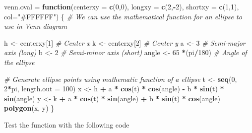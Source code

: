 \documentclass[
]{article}
\newenvironment{Shaded}{\begin{snugshade}}{\end{snugshade}}
\newcommand{\AttributeTok}[1]{\textcolor[rgb]{0.13,0.29,0.53}{#1}}
\newcommand{\CommentTok}[1]{\textcolor[rgb]{0.56,0.35,0.01}{\textit{#1}}}
\newcommand{\ControlFlowTok}[1]{\textcolor[rgb]{0.13,0.29,0.53}{\textbf{#1}}}
\newcommand{\DecValTok}[1]{\textcolor[rgb]{0.00,0.00,0.81}{#1}}
\newcommand{\FunctionTok}[1]{\textcolor[rgb]{0.13,0.29,0.53}{\textbf{#1}}}
\newcommand{\NormalTok}[1]{#1}
\newcommand{\OtherTok}[1]{\textcolor[rgb]{0.56,0.35,0.01}{#1}}
\newcommand{\SpecialCharTok}[1]{\textcolor[rgb]{0.81,0.36,0.00}{\textbf{#1}}}
\newcommand{\StringTok}[1]{\textcolor[rgb]{0.31,0.60,0.02}{#1}}
\begin{document}
\begin{Shaded}
\begin{Highlighting}[]
\NormalTok{venn.oval }\OtherTok{=} \ControlFlowTok{function}\NormalTok{(}\AttributeTok{centerxy =} \FunctionTok{c}\NormalTok{(}\DecValTok{0}\NormalTok{,}\DecValTok{0}\NormalTok{), }\AttributeTok{longxy =} \FunctionTok{c}\NormalTok{(}\DecValTok{2}\NormalTok{,}\SpecialCharTok{{-}}\DecValTok{2}\NormalTok{), }
                 \AttributeTok{shortxy =} \FunctionTok{c}\NormalTok{(}\DecValTok{1}\NormalTok{,}\DecValTok{1}\NormalTok{), }\AttributeTok{col=}\StringTok{"\#FFFFFF"}\NormalTok{)}
\NormalTok{\{}
\CommentTok{\# We can use the mathematical function for an ellipse to use in Venn diagram }

\NormalTok{h }\OtherTok{\textless{}{-}}\NormalTok{ centerxy[}\DecValTok{1}\NormalTok{]  }\CommentTok{\# Center x}
\NormalTok{k }\OtherTok{\textless{}{-}}\NormalTok{ centerxy[}\DecValTok{2}\NormalTok{]  }\CommentTok{\# Center y}
\NormalTok{a }\OtherTok{\textless{}{-}} \DecValTok{3}  \CommentTok{\# Semi{-}major axis (long)}
\NormalTok{b }\OtherTok{\textless{}{-}} \DecValTok{2}  \CommentTok{\# Semi{-}minor axis (short)}
\NormalTok{angle }\OtherTok{\textless{}{-}} \DecValTok{65} \SpecialCharTok{*}\NormalTok{(pi}\SpecialCharTok{/}\DecValTok{180}\NormalTok{) }\CommentTok{\# Angle of the ellipse}

\CommentTok{\# Generate ellipse points using mathematic function of a ellipse}
\NormalTok{t }\OtherTok{\textless{}{-}} \FunctionTok{seq}\NormalTok{(}\DecValTok{0}\NormalTok{, }\DecValTok{2}\SpecialCharTok{*}\NormalTok{pi, }\AttributeTok{length.out =} \DecValTok{100}\NormalTok{)}
\NormalTok{x }\OtherTok{\textless{}{-}}\NormalTok{ h }\SpecialCharTok{+}\NormalTok{ a }\SpecialCharTok{*} \FunctionTok{cos}\NormalTok{(t) }\SpecialCharTok{*} \FunctionTok{cos}\NormalTok{(angle) }\SpecialCharTok{{-}}\NormalTok{ b }\SpecialCharTok{*} \FunctionTok{sin}\NormalTok{(t) }\SpecialCharTok{*} \FunctionTok{sin}\NormalTok{(angle)}
\NormalTok{y }\OtherTok{\textless{}{-}}\NormalTok{ k }\SpecialCharTok{+}\NormalTok{ a }\SpecialCharTok{*} \FunctionTok{cos}\NormalTok{(t) }\SpecialCharTok{*} \FunctionTok{sin}\NormalTok{(angle) }\SpecialCharTok{+}\NormalTok{ b }\SpecialCharTok{*} \FunctionTok{sin}\NormalTok{(t) }\SpecialCharTok{*} \FunctionTok{cos}\NormalTok{(angle)}
\FunctionTok{polygon}\NormalTok{(x, y)}
\NormalTok{  \}}
\end{Highlighting}
\end{Shaded}

Test the function with the following code
\end{document}
